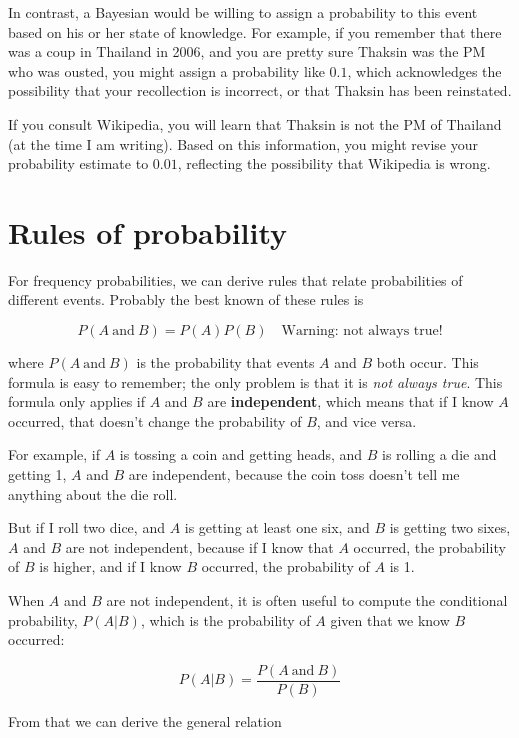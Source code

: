 \documentclass[12pt]{book}
\begin{document}
In contrast, a Bayesian would be willing to assign a probability to
this event based on his or her state of knowledge.  For example, if
you remember that there was a coup in Thailand in 2006, and you are
pretty sure Thaksin was the PM who was ousted, you might
assign a probability like $0.1$, which acknowledges the possibility
that your recollection is incorrect, or that Thaksin has been
reinstated.

If you consult Wikipedia, you will learn that Thaksin is not the
PM of Thailand (at the time I am writing).  Based on this
information, you might revise your probability estimate to $0.01$,
reflecting the possibility that Wikipedia is wrong.


\section{Rules of probability}

For frequency probabilities, we can derive rules that relate
probabilities of different events.  Probably the best known of these
rules is

\newcommand{\AND}{~\mbox{and}~}

\[ P(A \AND B) = P(A) P(B) \quad \mbox{Warning: not always true!}\]

where $P(A \AND B)$ is the probability that events $A$ and $B$ both
occur.  This formula is easy to remember; the only problem is that it
is {\em not always true}.  This formula only applies if $A$ and $B$
are {\bf independent}, which means that if I know $A$ occurred, that
doesn't change the probability of $B$, and vice versa.

For example, if $A$ is tossing a coin and getting heads, and $B$
is rolling a die and getting 1, $A$ and $B$ are independent, because
the coin toss doesn't tell me anything about the die roll.

But if I roll two dice, and $A$ is getting at least one six, and
$B$ is getting two sixes, $A$ and $B$ are not independent, because
if I know that $A$ occurred, the probability of $B$ is higher, and
if I know $B$ occurred, the probability of $A$ is 1.

When $A$ and $B$ are not independent, it is often useful to compute
the conditional probability, $P(A|B)$, which is the probability of
$A$ given that we know $B$ occurred:

\[ P(A|B) = \frac{P(A \AND B)}{P(B)} \]

From that we can derive the general relation
\end{document}
